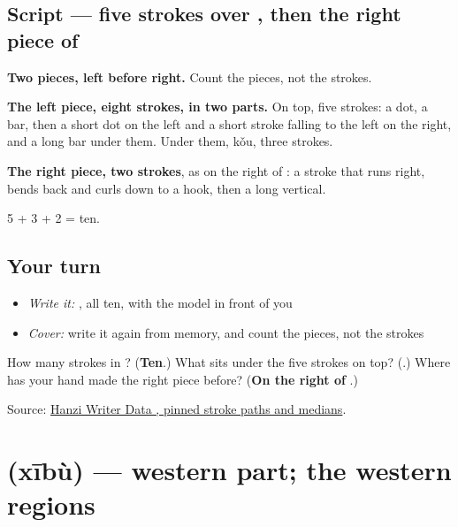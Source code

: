 \subsection*{Script — five strokes over , then the right piece of }

\begin{quote}
\end{quote}

\textbf{Two pieces, left before right.} Count the pieces, not the strokes.

\textbf{The left piece, eight strokes, in two parts.} On top, five strokes: a dot, a bar, then a short dot on the left and a short stroke falling to the left on the right, and a long bar under them. Under them,  kǒu, three strokes.

\textbf{The right piece, two strokes}, as on the right of : a stroke that runs right, bends back and curls down to a hook, then a long vertical.

5 + 3 + 2 = ten.

\subsection*{Your turn}
\begin{itemize}
\raggedright
  \item \emph{Write it:} , all ten, with the model in front of you
  \item \emph{Cover:} write it again from memory, and count the pieces, not the strokes
\end{itemize}

\begin{tcolorbox}[breakable,colback=teal!4,colframe=teal!35!black,title={Before you move on}]
How many strokes in ? (\textbf{Ten}.) What sits under the five strokes on top? (\textbf{}.) Where has your hand made the right piece before? (\textbf{On the right of }.)

Source: \href{https://raw.githubusercontent.com/chanind/hanzi-writer-data/68d10a4b21150cae5e1ebbd223eed289cf32d90c/data/\%E9\%83\%A8.json}{Hanzi Writer Data , pinned stroke paths and medians}.
\end{tcolorbox}
\section[\texorpdfstring{\zh{西部} (xībù)}{西部 (xībù)}]{ (xībù) — western part; the western regions}

